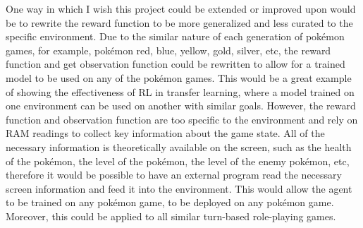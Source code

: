 One way in which I wish this project could be extended or improved upon would be to rewrite the reward function to be more generalized and less curated to the specific environment. Due to the similar nature of each generation of pokémon games, for example, pokémon red, blue, yellow, gold, silver, etc, the reward function and get observation function could be rewritten to allow for a trained model to be used on any of the pokémon games. This would be a great example of showing the effectiveness of RL in transfer learning, where a model trained on one environment can be used on another with similar goals. However, the reward function and observation function are too specific to the environment and rely on RAM readings to collect key information about the game state. All of the necessary information is theoretically available on the screen, such as the health of the pokémon, the level of the pokémon, the level of the enemy pokémon, etc, therefore it would be possible to have an external program read the necessary screen information and feed it into the environment. This would allow the agent to be trained on any pokémon game, to be deployed on any pokémon game. Moreover, this could be applied to all similar turn-based role-playing games. 